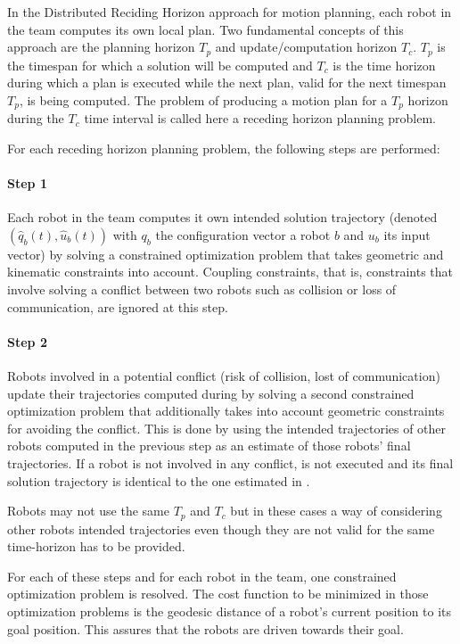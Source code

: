 \documentclass[letterpaper, 10 pt, conference]{ieeeconf}  %
\begin{document}
In the Distributed Reciding Horizon approach for motion planning, each robot in the team computes its own local plan. Two fundamental concepts of this approach are the planning horizon $T_p$ and update/computation horizon $T_c$. $T_p$ is the timespan for which a solution will be computed and $T_c$ is the time horizon during which a plan is executed while the next plan, valid for the next timespan $T_p$, is being computed. The problem of producing a motion plan for a $T_p$ horizon during the $T_c$ time interval is called
here a receding horizon planning problem.

For each receding horizon planning problem, the following steps are performed:
\paragraph*{Step 1}\label{step1} Each robot in the team computes it own intended solution trajectory (denoted $(\hat{q}_b(t), \hat{u}_b(t))$ with $q_b$ the configuration vector a robot $b$ and $u_b$ its input vector) by solving a constrained optimization problem that takes geometric and kinematic constraints into account. Coupling constraints, that is, constraints that involve solving a conflict between two robots such as collision or loss of communication, are ignored at this step.
\paragraph*{Step 2}\label{step2} Robots involved in a potential conflict (risk of collision, lost of communication) update their trajectories computed during  by solving a second constrained optimization problem that additionally takes into account geometric constraints for avoiding the conflict. This is done by using the intended trajectories of other robots computed in the previous step as an estimate of those robots' final trajectories. If a robot is not involved in any conflict,  is not executed and its final solution trajectory is identical to the one estimated in .

Robots may not use the same $T_p$ and $T_c$ but in these cases a way of considering other robots intended trajectories even though they are not valid for the same time-horizon has to be provided.

For each of these steps and for each robot in the team, one constrained optimization problem is resolved. The cost function to be minimized in those optimization problems is the geodesic distance of a robot's current position to its goal position. This assures that the robots are driven towards their goal.
\end{document}

